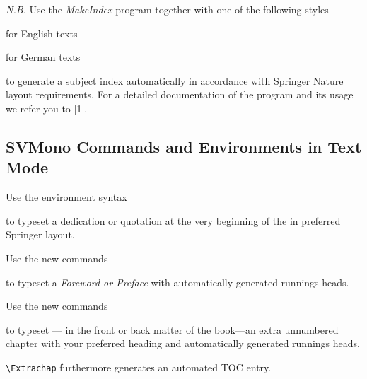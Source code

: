 \documentclass[graybox,square]{svmono}
\begin{document}
\begin{sloppy}
\textit{N.B.} Use the \textit{MakeIndex} program together with one of the following styles

\begin{description}
\item[\texttt{svind.ist}] for English texts
\item[\texttt{svindd.ist}] for German texts
\end{description}
to generate a subject index automatically in accordance with Springer Nature layout
requirements. For a detailed documentation of the program and its usage we
refer you to [1].

\subsection{SVMono Commands and Environments in Text Mode}\label{subsec:4}

Use the environment syntax

\cprotect{}

to typeset a dedication or quotation at the very beginning of the in preferred Springer layout.



Use the new commands
\cprotect{}

to typeset a {\it Foreword or Preface} with automatically generated runnings heads.



Use the new commands
\cprotect{}

to typeset --- in the front or back matter of the book---an extra unnumbered chapter with your preferred heading and automatically generated runnings heads.

\verb|\Extrachap| furthermore generates an automated TOC entry.




\end{sloppy}
\end{document}
